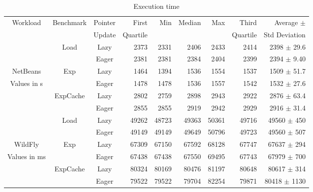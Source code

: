\documentclass[sigplan,10pt,screen]{acmart}\settopmatter{printfolios=true,printccs=true,printacmref=true}
\begin{document}
\begin{table} [bht]
\centering
\caption{Execution time\vspace{-0.2cm}}
\begin{tabular}{c|c|c|r|r|r|r|r|r}
	 \multirow{2}{*}{Workload} & \multirow{2}{*}{Benchmark} 	& Pointer  		& First			& \multirow{2}{*}{Min} &  \multirow{2}{*}{Median} & \multirow{2}{*}{Max} & Third 		& Average $\pm$ \\
						&					      	& Update 		& \small{Quartile}	& 				  & 					  & 				    & \small{Quartile} 	& \small{Std Deviation} \\
	\hline
						& \multirow{2}{*}{Load} 	 	& Lazy		& 2373	& 2331	& 2406	& 2433 & 2414	& 2398 $\pm$ 29.6 \\
						&						& Eager		& 2381	& 2381	& 2384	& 2404 & 2399	& 2394 $\pm$ 9.40 \\
	NetBeans				& \multirow{2}{*}{Exp} 		& Lazy		& 1464	& 1394	& 1536	&1554  & 1537	& 1509 $\pm$ 51.7 \\
	\small{Values in s}		&					  	& Eager		& 1478	& 1478	& 1536	& 1557 & 1542	& 1532 $\pm$ 27.6 \\
						& \multirow{2}{*}{ExpCache}	& Lazy		& 2802	& 2759	& 2898	& 2943 & 2922	& 2876 $\pm$ 63.4 \\
						&					  	& Eager		& 2855	& 2855	& 2919	& 2942 & 2929	& 2916 $\pm$ 31.4 \\
	\hline
						& \multirow{2}{*}{Load} 	 	& Lazy		& 49262	& 48723			& 49363	& 50361	& 49716		& 49560 $\pm$ 450 \\
						&						& Eager		& 49149	& 49149			& 49649	& 50796	& 49723		& 49560 $\pm$ 507 \\
	WildFly				& \multirow{2}{*}{Exp} 		& Lazy		& 67309	& 67150			& 67592	& 68128	& 67747		& 67637 $\pm$ 294 \\
	\small{Values in ms}	&					  		& Eager		& 67438	& 67438			& 67550	& 69495	& 67743		& 67979 $\pm$ 700\\
						& \multirow{2}{*}{ExpCache} 	& Lazy		& 80324	& 80169			& 80476	& 81197	& 80648		& 80617 $\pm$ 314 \\
						&					  	& Eager		& 79522	& 79522			& 79704	& 82254	& 79871		& 80418 $\pm$ 1130 \\
	\end{tabular} 
\label{tab:execTimeTable}
\vspace{-0.1cm}
\end{table}
\end{document}
